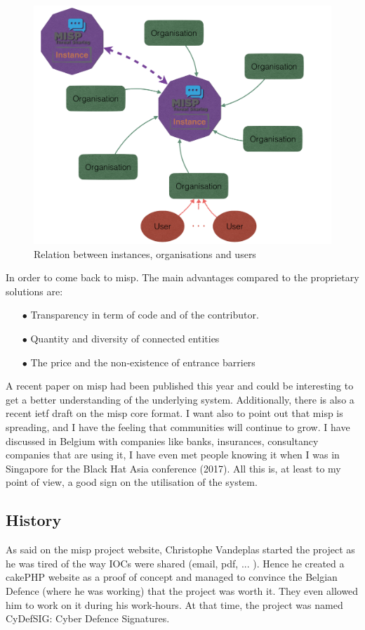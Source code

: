 \documentclass{eplmastersthesis}
\begin{document}
\begin{figure}
\centering
\includegraphics[scale=0.4]{res/misp-organisations}
\caption{Relation between instances, organisations and users}
\label{misp-organisations}
\end{figure}

In order to come back to \gls{misp}. The main advantages compared to the proprietary solutions are:
\begin{itemize}
\item[$\bullet$] Transparency in term of code and of the contributor.
\item[$\bullet$] Quantity and diversity of connected entities
\item[$\bullet$] The price and the non-existence of entrance barriers
\end{itemize}

A recent paper on \gls{misp} \cite{wagner2016misp} had been published this year and could be interesting to get a better understanding of the underlying system. Additionally, there is also a recent \gls{ietf} draft on the \gls{misp} core format\cite{MispDraft}.
I want also to point out that \gls{misp} is spreading, and I have the feeling that communities will continue to grow. I have discussed in Belgium with companies like banks, insurances, consultancy companies that are using it, I have even met people knowing it when I was in Singapore for the Black Hat Asia conference (2017). All this is, at least to my point of view, a good sign on the utilisation of the system.

\subsection{History}
As said on the \gls{misp} project website, Christophe Vandeplas started the project as he was tired of the way IOCs were shared (email, pdf, ... ). Hence he created a cakePHP website as a proof of concept and managed to convince the Belgian Defence (where he was working) that the project was worth it. They even allowed him to work on it during his work-hours. At that time, the project was named CyDefSIG: Cyber Defence Signatures.\\
\end{document}
